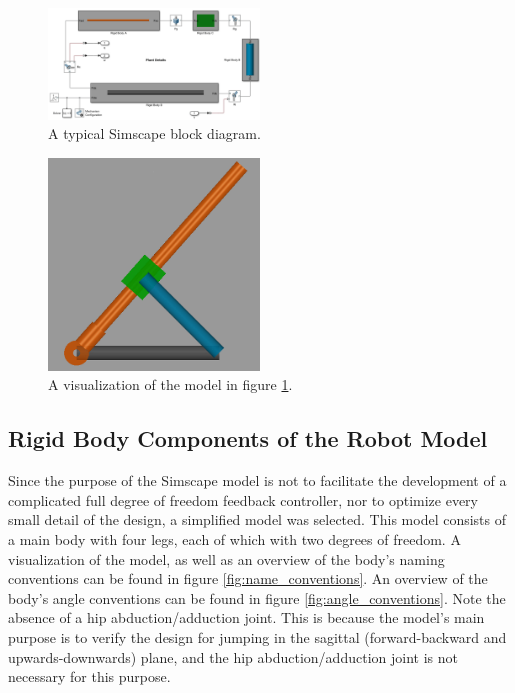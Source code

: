 \begin{figure}
    \centering
    \includegraphics[width=0.5\textwidth]{Images/simscape_tutorial_diagram.png}
    \caption{A typical Simscape block diagram.}
    \label{fig:simscape_tutorial_diagram}
\end{figure}
\begin{figure}
    \centering
    \includegraphics[width=0.5\textwidth]{Images/simscape_tutorial_visualization.png}
    \caption{A visualization of the model in figure \ref{fig:simscape_tutorial_diagram}.}
    \label{fig:simscape_tutorial_visualization}
\end{figure}

\subsection{Rigid Body Components of the Robot Model}
\label{sec:robot_main_parts}

Since the purpose of the Simscape model is not to facilitate the development of a complicated full degree of freedom feedback controller, nor to optimize every small detail of the design, a simplified model was selected. This model consists of a main body with four legs, each of which with two degrees of freedom. A visualization of the model, as well as an overview of the body's naming conventions can be found in figure \ref{fig:name_conventions}. An overview of the body's angle conventions can be found in figure \ref{fig:angle_conventions}. Note the absence of a hip abduction/adduction joint. This is because the model's main purpose is to verify the design for jumping in the sagittal (forward-backward and upwards-downwards) plane, and the hip abduction/adduction joint is not necessary for this purpose.


